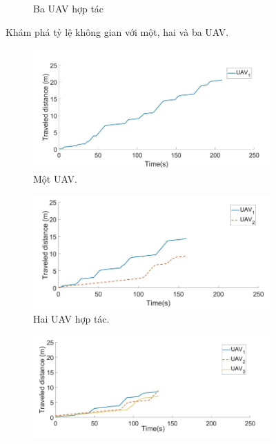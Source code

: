 \documentclass[11pt,openany]{book}
\begin{document}
\begin{algorimth}[H]
\begin{figure}[H]
\begin{subfigure}[H]{0.7\linewidth}
        \caption{{Ba UAV hợp tác}}
        \label{fig:3.18c}
    \end{subfigure}
    \caption{Khám phá tỷ lệ không gian với một, hai và ba UAV.}
    \label{fig:3.18}
\end{figure}
\begin{figure}[H]
    \centering
    \begin{subfigure}[H]{0.7\linewidth}
        \includegraphics[chiều rộng=\linewidth]{assets/3_20_a.png}
        \caption{{Một UAV.}}
        \label{fig:3.20a}
    \end{subfigure}
    \begin{subfigure}[H]{0.7\linewidth}
        \includegraphics[chiều rộng=\linewidth]{assets/3_20_b.png}
        \caption{{Hai UAV hợp tác.}}
        \label{fig:3.20b}
    \end{subfigure}
    \begin{subfigure}[H]{0.7\linewidth}
        \includegraphics[chiều rộng=\linewidth]{assets/3_20_c.png}

\end{subfigure}
\end{figure}
\end{algorimth}
\end{document}
